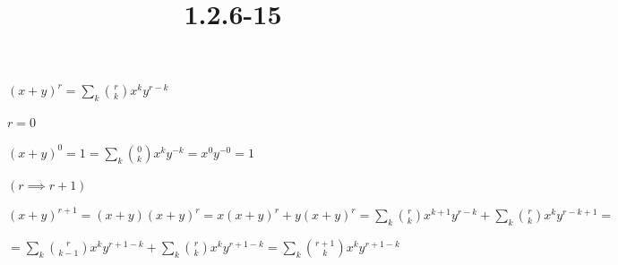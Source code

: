 \documentclass{article}
\title{1.2.6-15}
\begin{document}
\maketitle

$(x+y)^r = \sum_k \binom{r}{k} x^k y^{r-k}$

$r = 0$

$(x+y)^0 = 1 = \sum_k \binom{0}{k} x^k y^{-k} = x^0y^{-0} = 1$

$(r \implies r + 1)$

$(x+y)^{r+1} = (x+y)(x+y)^r = x(x+y)^r + y(x+y)^r = \sum_k \binom{r}{k} x^{k+1} y^{r-k} + \sum_k \binom{r}{k} x^k y^{r-k+1} =$

$= \sum_k \binom{r}{k-1} x^{k} y^{r+1-k} + \sum_k \binom{r}{k} x^k y^{r+1-k} = \sum_k \binom{r+1}{k} x^k y^{r+1-k}$
\end{document}
